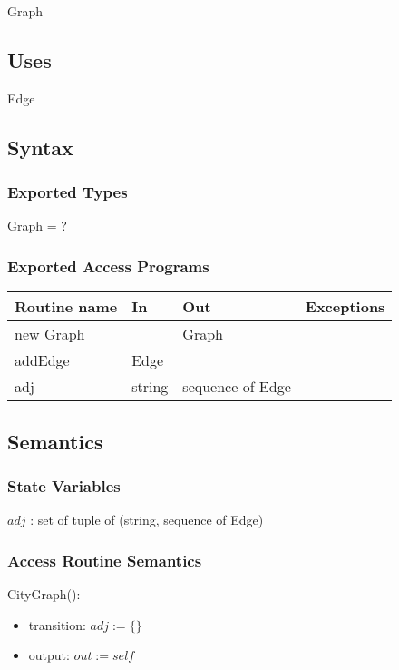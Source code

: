 \documentclass[12pt]{article}
\begin{document}
Graph

\subsection* {Uses}

Edge

\subsection* {Syntax}

\subsubsection* {Exported Types}

Graph = ?


\subsubsection* {Exported Access Programs}

\begin{tabular}{| l | l | l | p{6cm} |}
\hline
\textbf{Routine name} & \textbf{In} & \textbf{Out} & \textbf{Exceptions}\\
\hline
new Graph &  & Graph & \\
\hline
addEdge & Edge &  & \\
\hline
adj & string & sequence of Edge & \\
\hline
\end{tabular}

\subsection* {Semantics}

\subsubsection* {State Variables}

$\mathit{adj}$ : set of tuple of (string, sequence of Edge) \\


\subsubsection* {Access Routine Semantics}

CityGraph():
\begin{itemize}
\item transition: $adj := \{\}$ 

\item output: $\mathit{out} := \mathit{self}$
\end{itemize}
\end{document}

